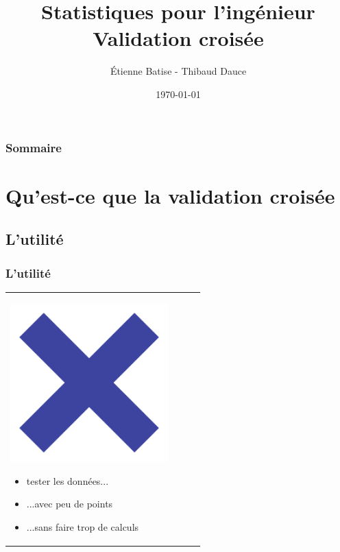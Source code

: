 \documentclass[handout]{beamer}
\title[Stats]{
	Statistiques pour l'ingénieur\\
	Validation croisée
}
\author{
	Étienne Batise - Thibaud Dauce
}
\date{\today}
\begin{document}
	
	\begin{frame}[plain]
		\titlepage
	\end{frame}

	\begin{frame}[plain]
		\frametitle{Sommaire}
		\tableofcontents
	\end{frame}


	\section{Qu'est-ce que la validation croisée}

	\subsection{L'utilité}
		\begin{frame}
		\frametitle{L'utilité}
		\begin{tabular}{l l}
			\begin{minipage}{0.2\textwidth}
				\begin{center}
					\includegraphics[width=0.9\textwidth]{images/cross.png}
				\end{center}
			\end{minipage}

			\begin{minipage}{0.8\textwidth}
				\begin{itemize}
					\item tester les données...
					\item ...avec peu de points
					\item ...sans faire trop de calculs
				\end{itemize}
			\end{minipage}

		\end{tabular}
		\end{frame}
\end{document}
